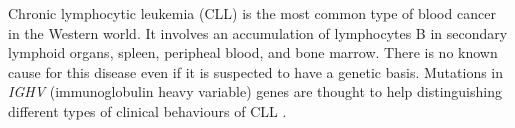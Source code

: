 Chronic lymphocytic leukemia (CLL) is the most common type of blood cancer in the Western world.
It involves an accumulation of lymphocytes B in secondary lymphoid organs, spleen, peripheal blood, and bone marrow.\cite{cll-burger-med, cll-rozman-med}  There is no known cause for this disease even if it is suspected to have a genetic basis. Mutations in \textit{IGHV} (immunoglobulin heavy variable) genes
are thought to help distinguishing different types of clinical behaviours of CLL \cite{immunogl-med}.\\
